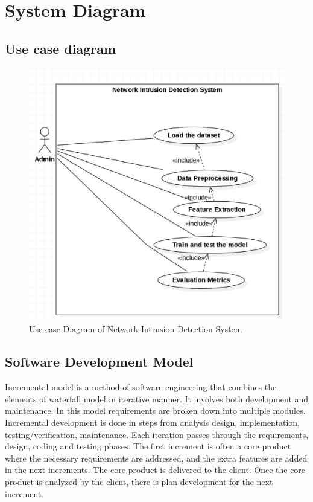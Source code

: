 \section{System Diagram}
\vspace{-18pt}
\subsection{Use case diagram}
\begin{figure}[h]
\begin{center}
	\includegraphics[width=5in]{images/use.jpg} 
	\caption{Use case Diagram of Network Intrusion Detection System} %
	\label{Use case Diagram of Network Intrusion Detection System} %
\end{center}
\end{figure}
\newpage
\subsection{Software Development Model}
\vspace{-18pt}
Incremental model is a method of software engineering that combines the elements of waterfall model in iterative manner. It involves both development and maintenance. In this model requirements are broken down into multiple modules. Incremental development is done in steps from analysis design, implementation, testing/verification, maintenance. Each iteration passes through the requirements, design, coding and testing phases. The first increment is often a core product where the necessary requirements are addressed, and the extra features are added in the next increments. The core product is delivered to the client. Once the core product is analyzed by the client, there is plan development for the next increment.

